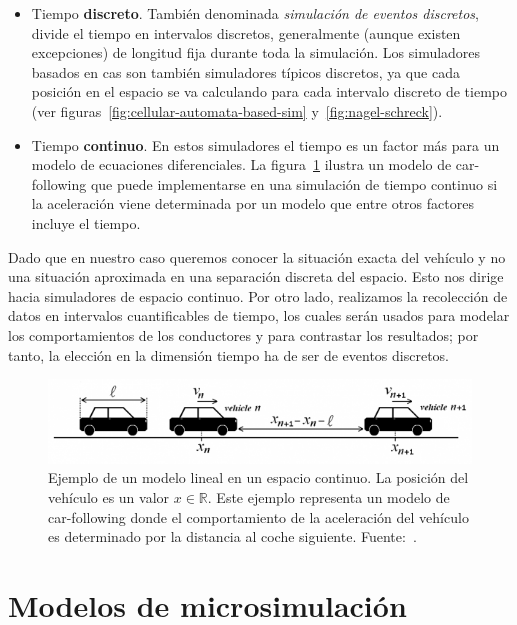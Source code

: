 \begin{itemize}
	\item Tiempo \textbf{discreto}. También denominada \textit{simulación de eventos discretos}, divide el tiempo en intervalos discretos, generalmente (aunque existen excepciones) de longitud fija durante toda la simulación. Los simuladores basados en \acp{ca} son también simuladores típicos discretos, ya que cada posición en el espacio se va calculando para cada intervalo discreto de tiempo (ver figuras~\ref{fig:cellular-automata-based-sim} y~\ref{fig:nagel-schreck}).
	\item Tiempo \textbf{continuo}. En estos simuladores el tiempo es un factor más para un modelo de ecuaciones diferenciales. La figura~\ref{fig:car-following-based-sim} ilustra un modelo de \gls{car-following} que puede implementarse en una simulación de tiempo continuo si la aceleración viene determinada por un modelo que entre otros factores incluye el tiempo.
\end{itemize}

Dado que en nuestro caso queremos conocer la situación exacta del vehículo y no una situación aproximada en una separación discreta del espacio. Esto nos dirige hacia simuladores de espacio continuo. Por otro lado, realizamos la recolección de datos en intervalos cuantificables de tiempo, los cuales serán usados para modelar los comportamientos de los conductores y para contrastar los resultados; por tanto, la elección en la dimensión tiempo ha de ser de eventos discretos.

\begin{figure}
	\centering
	\includegraphics{images/car-following-based-sim}
	\caption{Ejemplo de un modelo lineal en un espacio continuo. La posición del vehículo es un valor $x \in \mathbb{R}$. Este ejemplo representa un modelo de \gls{car-following} donde el comportamiento de la aceleración del vehículo es determinado por la distancia al coche siguiente. Fuente:~\cite{Tordeux2011}.}
	\label{fig:car-following-based-sim}
\end{figure}

\section{Modelos de microsimulación}

